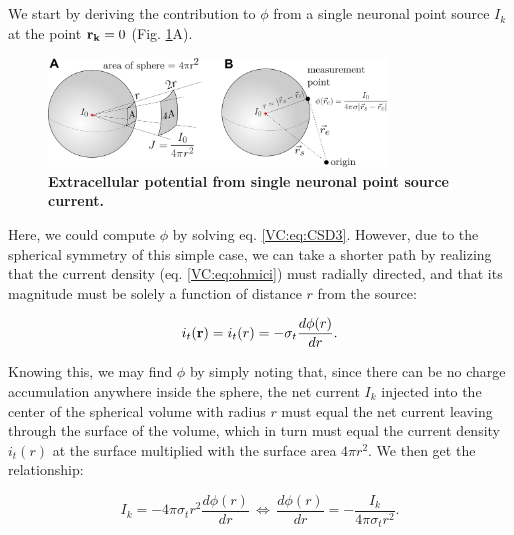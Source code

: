 \subsection{}
\label{sec:VC:pointsource}

We start by deriving the contribution to $\phi$ from a single neuronal point source $I_k$ at the point ${\bf r_k}=0$ (Fig. \ref{VC:fig:pointsource}A).

\begin{figure}[!ht]
\begin{center}
\includegraphics[width=0.8\textwidth]{Figures/VC/EP_from_pointsource_illustration.png}
\end{center}
\caption{\textbf{Extracellular potential from single neuronal point source current.}
 
}
\label{VC:fig:pointsource}
\end{figure}

Here, we could compute $\phi$ by solving eq. \ref{VC:eq:CSD3}. However, due to the spherical symmetry of this simple case, we can take a shorter path by realizing that the current density (eq. \ref{VC:eq:ohmici}) must radially directed, and that its magnitude must be solely a function of distance $r$ from the source:

\begin{equation}
i_t({\bf r}) = i_t(r) = -\sigma_t \frac{d\phi(r)}{dr}.
\end{equation}

Knowing this, we may find $\phi$ by simply noting that, since there can be no charge accumulation anywhere inside the sphere, the net current $I_k$ injected into the center of the spherical volume with radius $r$ must equal the net current leaving through the surface of the volume, which in turn must equal the current density $i_t(r)$ at the surface multiplied with the surface area $4\pi r^2$. We then get the relationship:

\begin{equation}
I_k = -4\pi \sigma_t r^2  \frac{d\phi(r)}{dr} \, \iff \, \frac{d\phi(r)}{dr} = -\frac{I_k}{4\pi \sigma_t r^2 }.
\label{VC:eq:knut}
\end{equation}

